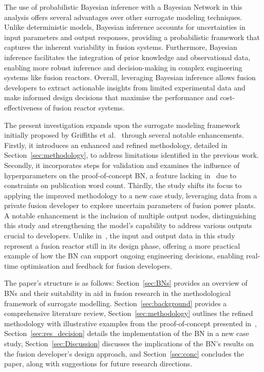 \documentclass[journal]{IEEEtran}
\begin{document}
The use of probabilistic Bayesian inference with a Bayesian Network in this analysis offers several advantages over other surrogate modeling techniques. Unlike deterministic models, Bayesian inference accounts for uncertainties in input parameters and output responses, providing a probabilistic framework that captures the inherent variability in fusion systems. Furthermore, Bayesian inference facilitates the integration of prior knowledge and observational data, enabling more robust inference and decision-making in complex engineering systems like fusion reactors. Overall, leveraging Bayesian inference allows fusion developers to extract actionable insights from limited experimental data and make informed design decisions that maximise the performance and cost-effectiveness of fusion reactor systems.

The present investigation expands upon the surrogate modeling framework initially proposed by Griffiths et al.~\cite{Griffiths2024} through several notable enhancements. Firstly, it introduces an enhanced and refined methodology, detailed in Section~\ref{sec:methodology}, to address limitations identified in the previous work. Secondly, it incorporates steps for validation and examines the influence of hyperparameters on the proof-of-concept BN, a feature lacking in~\cite{Griffiths2024} due to constraints on publication word count. Thirdly, the study shifts its focus to applying the improved methodology to a new case study, leveraging data from a private fusion developer to explore uncertain parameters of fusion power plants. A notable enhancement is the inclusion of multiple output nodes, distinguishing this study and strengthening the model's capability to address various outputs crucial to developers. Unlike in~\cite{Griffiths2024}, the input and output data in this study represent a fusion reactor still in its design phase, offering a more practical example of how the BN can support ongoing engineering decisions, enabling real-time optimisation and feedback for fusion developers.

The paper's structure is as follows: Section~\ref{sec:BNs} provides an overview of BNs and their suitability in aid in fusion research in the methodological framework of surrogate modelling. Section~\ref{sec:background} provides a comprehensive literature review, Section~\ref{sec:methodology} outlines the refined methodology with illustrative examples from the proof-of-concept presented in~\cite{Griffiths2024}, Section~\ref{sec:res_decision} details the implementation of the BN in a new case study, Section~\ref{sec:Discussion} discusses the implications of the BN's results on the fusion developer's design approach, and Section~\ref{sec:conc} concludes the paper, along with suggestions for future research directions.
\end{document}
